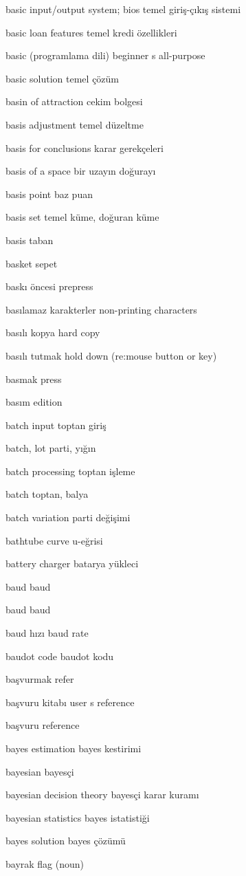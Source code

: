 \documentclass[12pt,fleqn]{article}\usepackage{../../common}
\begin{document}
basic input/output system; bios temel giriş-çıkış sistemi

basic loan features temel kredi özellikleri

basic (programlama dili) beginner s all-purpose

basic solution temel çözüm

basin of attraction cekim bolgesi

basis adjustment temel düzeltme

basis for conclusions karar gerekçeleri

basis of a space bir uzayın doğurayı

basis point baz puan

basis set temel küme, doğuran küme

basis taban

basket sepet

baskı öncesi prepress

basılamaz karakterler non-printing characters

basılı kopya hard copy

basılı tutmak hold down (re:mouse button or key)

basmak press

basım edition

batch input toptan giriş

batch, lot parti, yığın

batch processing toptan işleme

batch toptan, balya

batch variation parti değişimi

bathtube curve u-eğrisi

battery charger batarya yükleci

baud baud

baud baud

baud hızı baud rate

baudot code baudot kodu

başvurmak refer

başvuru kitabı user s reference

başvuru reference

bayes estimation bayes kestirimi

bayesian bayesçi

bayesian decision theory bayesçi karar kuramı

bayesian statistics bayes istatistiği

bayes solution bayes çözümü

bayrak flag (noun)
\end{document}
